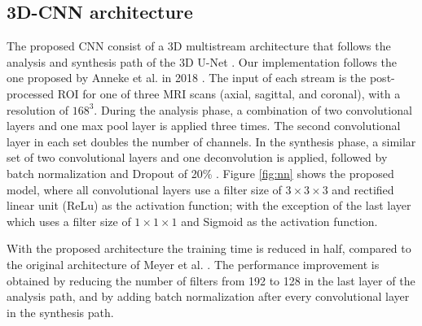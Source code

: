 
\subsection{3D-CNN architecture}
The proposed CNN consist of a 3D multistream architecture that follows the analysis and synthesis path of the 3D U-Net \cite{cciccek20163d}. Our implementation follows the one proposed by Anneke et al. in 2018  \cite{anneke}. The input of each stream is the post-processed ROI for one of three MRI scans (axial, sagittal, and coronal), with a resolution of $168^3$. During the analysis phase, a combination of two convolutional layers and one max pool layer is applied three times. The second convolutional layer in each set doubles the number of channels.  In the synthesis phase, a similar set of two convolutional layers and one deconvolution is applied, followed by batch normalization and Dropout of 20\% \cite{hinton2012improving}.
Figure \ref{fig:nn} shows the proposed model, where all convolutional layers use a filter size of $3 \times 3 \times 3$ and rectified linear unit (ReLu) as the activation function; with the exception of the last layer which uses a filter size of $1 \times 1 \times 1$  and Sigmoid as the activation function. 

With the proposed architecture the training time is reduced in half, compared to the original architecture of Meyer et al. \cite{anneke}. The performance improvement is obtained by reducing the number of filters from 192 to 128 in the last layer of the analysis path, and by adding batch normalization after every convolutional layer in the synthesis path.

